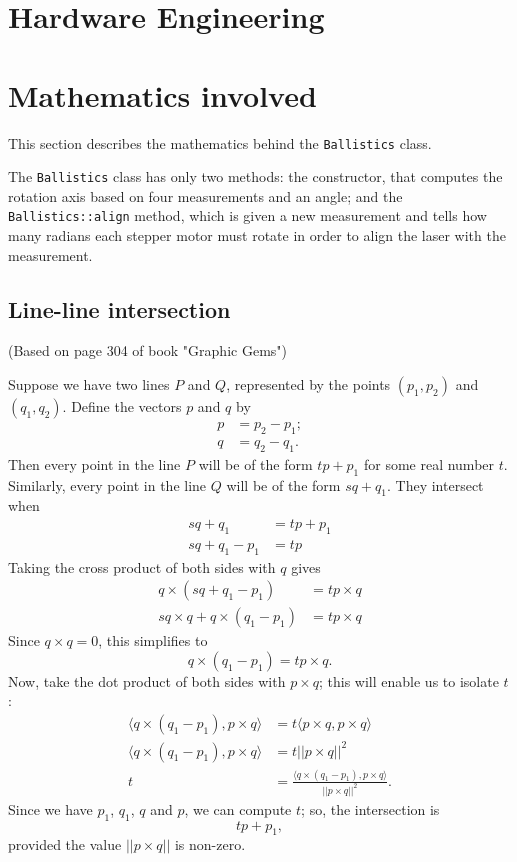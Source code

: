 \documentclass{article}
\newcommand\class[1]{\texttt{#1}}
\newcommand\method[1]{\texttt{#1}}
\begin{document}
\section{Hardware Engineering}

\section{Mathematics involved}

This section describes the mathematics behind the \class{Ballistics} class.

The \class{Ballistics} class has only two methods: the constructor,
that computes the rotation axis based on four measurements and an angle;
and the \method{Ballistics::align} method,
which is given a new measurement and tells how many radians
each stepper motor must rotate in order to align the laser with the measurement.

\subsection{Line-line intersection}

(Based on page 304 of book "Graphic Gems")

Suppose we have two lines $P$ and $Q$,
represented by the points $(p_1, p_2)$ and $(q_1, q_2)$.
Define the vectors $p$ and $q$ by
\begin{align*}
    p &= p_2 - p_1; \\
    q &= q_2 - q_1.
\end{align*}
Then every point in the line $P$ will be of the form $tp + p_1$
for some real number $t$.
Similarly, every point in the line $Q$ will be of the form $sq + q_1$.
They intersect when
\begin{align*}
    sq + q_1 &= tp + p_1 \\
    sq + q_1 - p_1 &= tp
\end{align*}
Taking the cross product of both sides with $q$ gives
\begin{align*}
    q \times (sq + q_1 - p_1) &= t p \times q \\
    s q \times q + q \times (q_1 - p_1) &= t p \times q
\end{align*}
Since $q \times q = 0$, this simplifies to
\begin{equation*}
    q \times (q_1 - p_1) = t p \times q.
\end{equation*}
Now, take the dot product of both sides with $p \times q$;
this will enable us to isolate $t$:
\begin{align*}
    \langle q \times (q_1 - p_1), p \times q \rangle
        &= t \langle p \times q, p \times q \rangle \\
    \langle q \times (q_1 - p_1), p \times q \rangle &= t ||p \times q||^2 \\
    t &= \frac{\langle q \times(q_1 - p_1), p \times q \rangle}{||p \times q||^2}.
\end{align*}
Since we have $p_1$, $q_1$, $q$ and $p$, we can compute $t$;
so, the intersection is
\begin{equation*}
    tp + p_1,
\end{equation*}
provided the value $|| p \times q ||$ is non-zero.
\end{document}
